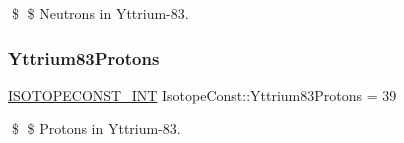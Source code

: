 \$ \$ Neutrons in Yttrium-\/83. \mbox{\label{group___isotope_const-_yttrium-_y83_ga57a928c5e91f48bf6c6fc438f7413bc6}} 
\subsubsection{\texorpdfstring{Yttrium83\+Protons}{Yttrium83Protons}}
{\footnotesize\ttfamily \mbox{\hyperlink{group___isotope_const-_macros_ga5f18360b3e99483a35c32d789e62621c}{I\+S\+O\+T\+O\+P\+E\+C\+O\+N\+S\+T\+\_\+\+I\+NT}} Isotope\+Const\+::\+Yttrium83\+Protons = 39}

\$ \$ Protons in Yttrium-\/83. 